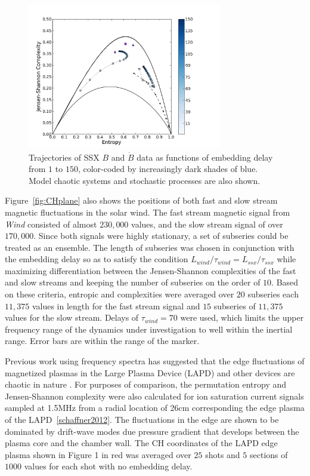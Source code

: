 \documentclass[aps,pre,twocolumn,secnumarabic,nobalancelastpage,amsmath,amssymb,
nofootinbib]{revtex4-1}
\begin{document}
\begin{figure}[!htbp]
\centerline{
\includegraphics[width=8.5cm]{fig3.png}}
\caption{\label{fig:embedscan}Trajectories of SSX $B$ and $\dot{B}$ data as functions of embedding delay from $1$ to $150$, color-coded by increasingly dark shades of blue. Model chaotic systems and stochastic processes are also shown.}
\end{figure} 

Figure~\ref{fig:CHplane} also shows the positions of both fast and slow stream magnetic fluctuations in the solar wind.  The fast stream magnetic signal from \textit{Wind} consisted of almost $230,000$ values, and the slow stream signal of over $170,000$. Since both signals were highly stationary, a set of subseries could be treated as an ensemble. The length of subseries was chosen in conjunction with the embedding delay so as to satisfy the condition $L_{wind}/\tau_{wind} = L_{ssx}/\tau_{ssx}$ while maximizing differentiation between the Jensen-Shannon complexities of the fast and slow streams and keeping the number of subseries on the order of $10$. Based on these criteria, entropic and complexities were averaged over $20$ subseries each $11,375$ values in length for the fast stream signal and $15$ subseries of $11,375$ values for the slow stream. Delays of $\tau_{wind} = 70$ were used, which limits the  upper frequency range of the dynamics under investigation to well within the inertial range. Error bars are within the range of the marker.

Previous work using frequency spectra has suggested that the edge fluctuations of magnetized plasmas in the Large Plasma Device (LAPD) and other devices are chaotic in nature \cite{maggs2012}. For purposes of comparison, the permutation entropy and Jensen-Shannon complexity were also calculated for ion saturation current signals sampled at 1.5MHz from a radial location of 26cm corresponding the edge plasma of the LAPD~\ref{schaffner2012}. The fluctuations in the edge are shown to be dominated by drift-wave modes due pressure gradient that develops between the plasma core and the chamber wall. The CH coordinates of the LAPD edge plasma shown in Figure 1 in red was averaged over $25$ shots and $5$ sections of $1000$ values for each shot with no embedding delay. 
\end{document}
